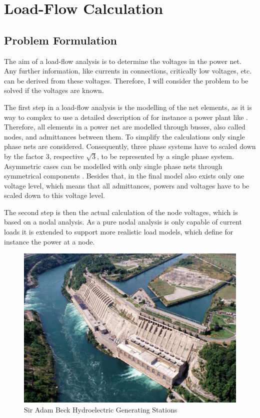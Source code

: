 \chapter{Load-Flow Calculation}

\section{Problem Formulation}

The aim of a load-flow analysis is to determine the voltages in the power net. Any further information, like currents in connections, critically low voltages, etc. can be derived from these voltages. Therefore, I will consider the problem to be solved if the voltages are known.

The first step in a load-flow analysis is the modelling of the net elements, as it is way to complex to use a detailed description of for instance a power plant like . Therefore, all elements in a power net are modelled through busses, also called nodes, and admittances between them. To simplify the calculations only single phase nets are considered. Consequently, three phase systems have to scaled down by the factor 3, respective $\sqrt{3}$, to be represented by a single phase system. Asymmetric cases can be modelled with only single phase nets through symmetrical components \citep[p. 399]{powerSystemAnalysis}. Besides that, in the final model also exists only one voltage level, which means that all admittances, powers and voltages have to be scaled down to this voltage level.

The second step is then the actual calculation of the node voltages, which is based on a nodal analysis. As a pure nodal analysis is only capable of current loads it is extended to support more realistic load models, which define for instance the power at a node.

\begin{figure}
	\includegraphics[width=\textwidth]{figures/adam_beck_complex.jpg}
	\caption{Sir Adam Beck Hydroelectric Generating Stations \citep{adam_back_complex}}
	\label{fig:power_plant}
\end{figure}

